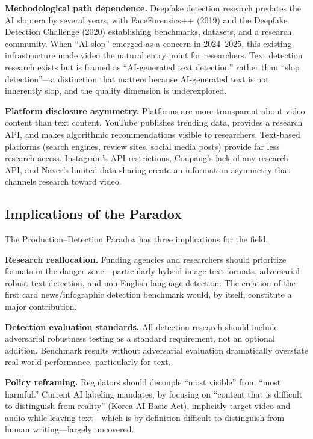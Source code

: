 \documentclass[12pt,a4paper]{article}
\begin{document}
\textbf{Methodological path dependence.} Deepfake detection research predates the AI slop era by several years, with FaceForensics++ (2019) and the Deepfake Detection Challenge (2020) establishing benchmarks, datasets, and a research community. When ``AI slop'' emerged as a concern in 2024--2025, this existing infrastructure made video the natural entry point for researchers. Text detection research exists but is framed as ``AI-generated text detection'' rather than ``slop detection''---a distinction that matters because AI-generated text is not inherently slop, and the quality dimension is underexplored.

\textbf{Platform disclosure asymmetry.} Platforms are more transparent about video content than text content. YouTube publishes trending data, provides a research API, and makes algorithmic recommendations visible to researchers. Text-based platforms (search engines, review sites, social media posts) provide far less research access. Instagram's API restrictions, Coupang's lack of any research API, and Naver's limited data sharing create an information asymmetry that channels research toward video.

\subsection{Implications of the Paradox}

The Production--Detection Paradox has three implications for the field.

\textbf{Research reallocation.} Funding agencies and researchers should prioritize formats in the danger zone---particularly hybrid image-text formats, adversarial-robust text detection, and non-English language detection. The creation of the first card news/infographic detection benchmark would, by itself, constitute a major contribution.

\textbf{Detection evaluation standards.} All detection research should include adversarial robustness testing as a standard requirement, not an optional addition. Benchmark results without adversarial evaluation dramatically overstate real-world performance, particularly for text.

\textbf{Policy reframing.} Regulators should decouple ``most visible'' from ``most harmful.'' Current AI labeling mandates, by focusing on ``content that is difficult to distinguish from reality'' (Korea AI Basic Act), implicitly target video and audio while leaving text---which is by definition difficult to distinguish from human writing---largely uncovered.
\end{document}

